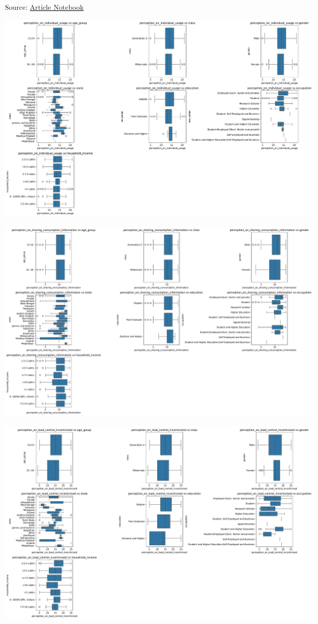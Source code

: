 \documentclass[
  letterpaper,
  DIV=11,
  numbers=noendperiod]{scrartcl}
\begin{document}
\textsubscript{Source:
\href{https://sijuswamyresearch.github.io/SM-project/index-preview.html}{Article
Notebook}}

\includegraphics{index_files/figure-pdf/cell-5-output-1.pdf}

\includegraphics{index_files/figure-pdf/cell-5-output-2.pdf}

\includegraphics{index_files/figure-pdf/cell-5-output-3.pdf}
\end{document}

